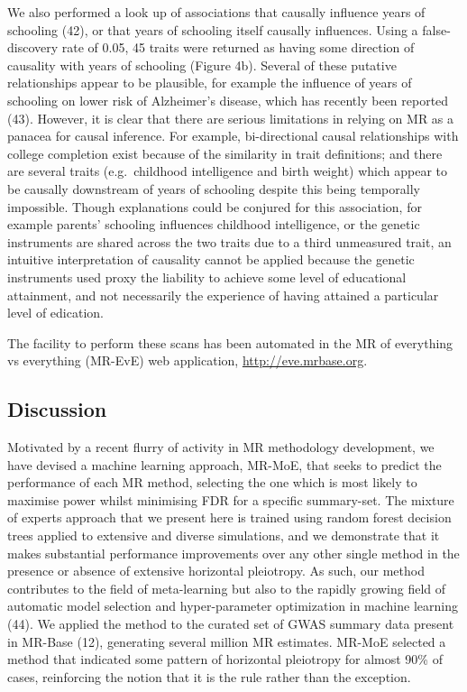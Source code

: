 \documentclass[]{article}
\begin{document}
We also performed a look up of associations that causally influence
years of schooling (42), or that years of schooling itself causally
influences. Using a false-discovery rate of 0.05, 45 traits were
returned as having some direction of causality with years of schooling
(Figure 4b). Several of these putative relationships appear to be
plausible, for example the influence of years of schooling on lower risk
of Alzheimer's disease, which has recently been reported (43). However,
it is clear that there are serious limitations in relying on MR as a
panacea for causal inference. For example, bi-directional causal
relationships with college completion exist because of the similarity in
trait definitions; and there are several traits (e.g.~childhood
intelligence and birth weight) which appear to be causally downstream of
years of schooling despite this being temporally impossible. Though
explanations could be conjured for this association, for example
parents' schooling influences childhood intelligence, or the genetic
instruments are shared across the two traits due to a third unmeasured
trait, an intuitive interpretation of causality cannot be applied
because the genetic instruments used proxy the liability to achieve some
level of educational attainment, and not necessarily the experience of
having attained a particular level of edication.

The facility to perform these scans has been automated in the MR of
everything vs everything (MR-EvE) web application,
\url{http://eve.mrbase.org}.

\subsection{Discussion}\label{discussion}

Motivated by a recent flurry of activity in MR methodology development,
we have devised a machine learning approach, MR-MoE, that seeks to
predict the performance of each MR method, selecting the one which is
most likely to maximise power whilst minimising FDR for a specific
summary-set. The mixture of experts approach that we present here is
trained using random forest decision trees applied to extensive and
diverse simulations, and we demonstrate that it makes substantial
performance improvements over any other single method in the presence or
absence of extensive horizontal pleiotropy. As such, our method
contributes to the field of meta-learning but also to the rapidly
growing field of automatic model selection and hyper-parameter
optimization in machine learning (44). We applied the method to the
curated set of GWAS summary data present in MR-Base (12), generating
several million MR estimates. MR-MoE selected a method that indicated
some pattern of horizontal pleiotropy for almost 90\% of cases,
reinforcing the notion that it is the rule rather than the exception.
\end{document}

